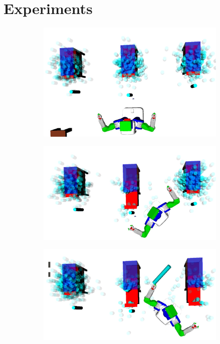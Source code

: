 \section{Experiments}
\begin{figure}
  \centering
  \begin{subfigure}[b]{0.48\linewidth}
    \includegraphics[width=\textwidth]{drawer_images/drawer_dist_0.png}
    \caption{}
  \end{subfigure}
  \begin{subfigure}[b]{0.48\linewidth}
    \includegraphics[width=\textwidth]{drawer_images/drawer_dist_1.png}
    \caption{}
  \end{subfigure}
  \begin{subfigure}[b]{0.48\linewidth}
    \includegraphics[width=\textwidth]{drawer_images/drawer_dist_2.png}

\end{subfigure}
\end{figure}

